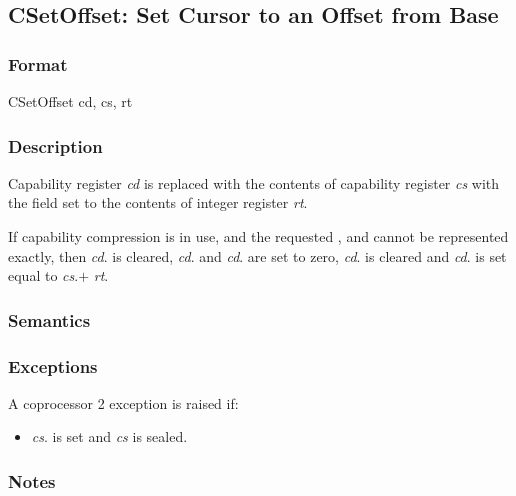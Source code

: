 \clearpage
{}
{}
\subsection*{CSetOffset: Set Cursor to an Offset from Base}

\subsubsection*{Format}

CSetOffset cd, cs, rt

\begin{center}
\end{center}

\subsubsection*{Description}

Capability register \emph{cd} is replaced with the contents of capability
register \emph{cs} with the \coffset{} field set to the contents of integer
register \textit{rt}.

If capability compression is in use, and the requested \cbase{}, \clength{}
and \coffset{} cannot be represented exactly, then \emph{cd}.\ctag{} is
cleared, \emph{cd}.\cbase{} and \emph{cd}.\clength{} are set to zero,
\emph{cd}.\cperms{} is cleared and \emph{cd}.\coffset{} is set equal to
\emph{cs}.\cbase $+$ \emph{rt}.

\subsubsection*{Semantics}


\subsubsection*{Exceptions}

A coprocessor 2 exception is raised if:

\begin{itemize}
\item
\emph{cs}.\ctag{} is set and \emph{cs} is sealed.
\end{itemize}

\subsubsection*{Notes}

